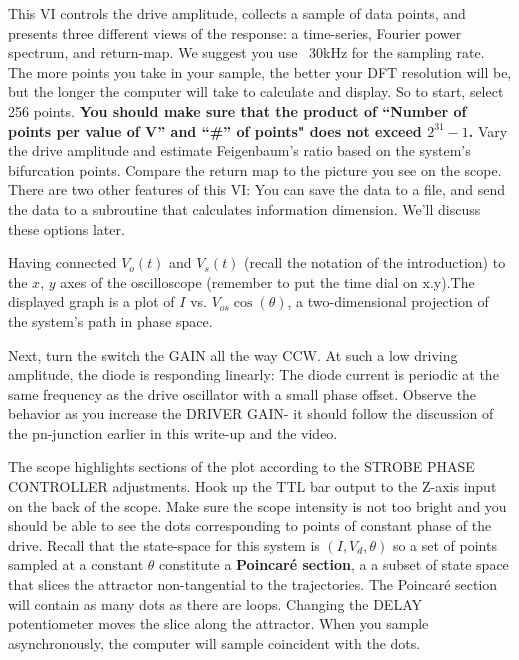 \documentclass{../lab}
\begin{document}
This VI controls the drive amplitude, collects a sample of data points, and presents three different views of the response: a time-series, Fourier power spectrum, and return-map. We suggest you use ~30kHz for the sampling rate. The more points you take in your sample, the better your DFT resolution will be, but the longer the computer will take to calculate and display. So to start, select 256 points. \textbf{You should make sure that the product of ``Number of points per value of V'' and ``\#'' of points" does not exceed $2^{31} - 1$.}  Vary the drive amplitude and estimate Feigenbaum's ratio based on the system's bifurcation points. Compare the return map to the picture you see on the scope. There are two other features of this VI: You can save the data to a file, and send the data to a subroutine that calculates information dimension. We'll discuss these options later.


Having connected $ V_o(t) $ and $ V_s(t) $ (recall the notation of the introduction) to the $x$, $y$ axes of the oscilloscope (remember to put the time dial on x.y).The displayed graph is a plot of $I$ vs. $V_{os} \cos(\theta)$, a two-dimensional projection of the system's path in phase space.

Next, turn the switch the GAIN all the way CCW. At such a low driving amplitude, the diode is responding linearly: The diode current is periodic at the same frequency as the drive oscillator with a small phase offset. Observe the behavior as you increase the DRIVER GAIN- it should follow the discussion of the pn-junction earlier in this write-up and the video.

The scope highlights sections of the plot according to the STROBE PHASE CONTROLLER adjustments. Hook up the TTL bar output to the Z-axis input on the back of the scope. Make sure the scope intensity is not too bright and you should be able to see the dots corresponding to points of constant phase of the drive. Recall that the state-space for this system is $(I, V_d,\theta)$ so a set of points sampled at a constant $\theta$ constitute a \textbf{Poincar\'e section}, a a subset of state space that slices the attractor non-tangential to the trajectories. The Poincar\'e section will contain as many dots as there are loops. Changing the DELAY potentiometer moves the slice along the attractor. When you sample asynchronously, the computer will sample coincident with the dots.
\end{document}
